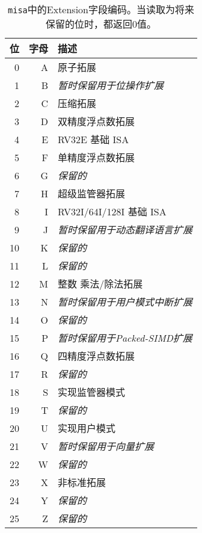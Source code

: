 \begin{table*}
\begin{center}
\begin{tabular}{|r|r|l|}
\hline
位 & 字母  & 描述 \\
\hline
  0 & A & 原子拓展 \\
  1 & B & {\em 暂时保留用于位操作扩展} \\
  2 & C & 压缩拓展 \\
  3 & D & 双精度浮点数拓展 \\
  4 & E & RV32E 基础 ISA \\
  5 & F & 单精度浮点数拓展 \\
  6 & G & {\em 保留的} \\
  7 & H & 超级监管器拓展 \\
  8 & I & RV32I/64I/128I 基础 ISA \\
  9 & J & {\em 暂时保留用于动态翻译语言扩展} \\
  10 & K & {\em 保留的} \\
  11 & L & {\em 保留的} \\
  12 & M & 整数 乘法/除法拓展 \\
  13 & N & {\em 暂时保留用于用户模式中断扩展} \\
  14 & O & {\em 保留的} \\
  15 & P & {\em 暂时保留用于Packed-SIMD扩展} \\
  16 & Q & 四精度浮点数拓展 \\
  17 & R & {\em 保留的} \\
  18 & S & 实现监管器模式 \\
  19 & T & {\em 保留的} \\
  20 & U & 实现用户模式 \\
  21 & V & {\em 暂时保留用于向量扩展} \\
  22 & W & {\em 保留的} \\
  23 & X & 非标准拓展 \\
  24 & Y & {\em 保留的} \\
  25 & Z & {\em 保留的} \\
\hline
\end{tabular}
\end{center}
\caption{{\tt misa}中的Extension字段编码。当读取为将来保留的位时，都返回0值。}
\label{misaletters}
\end{table*}


\iffalse
\begin{commentary}
The {\tt misa} CSR exposes a rudimentary catalog of CPU features
to machine-mode code.  More extensive information can be obtained in
machine mode by probing other machine registers, and examining other
ROM storage in the system as part of the boot process.

We require that lower privilege levels execute environment calls
instead of reading CPU registers to determine features available at
each privilege level. This enables virtualization layers to alter the
ISA observed at any level, and supports a much richer command
interface without burdening hardware designs.
\end{commentary}
\fi

